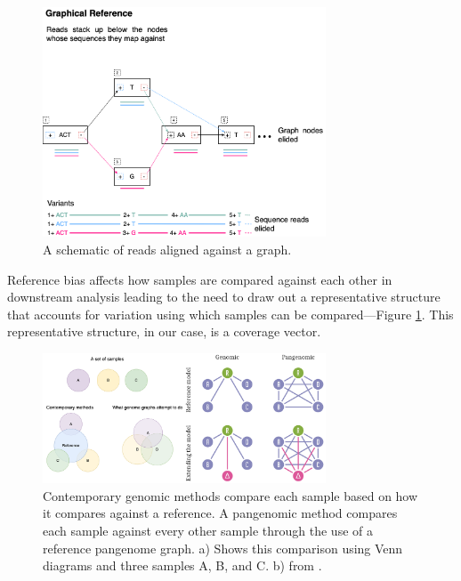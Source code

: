 \documentclass[10pt, a4paper]{article}
\begin{document}
\begin{figure}[htbp]
\centering
\includegraphics[width=0.75\textwidth]{../Figures/Alignment-graph-schematic.png}
\caption[Read alignment against a graph-based reference]{\label{fig:org1e6aadc}A schematic of reads aligned against a graph.}
\end{figure}


Reference bias affects how samples are compared against each other in downstream
analysis leading to the need to draw out a representative structure that
accounts for variation using which samples can be compared—Figure
\ref{fig:org1e6aadc}.
This representative structure, in our case, is a coverage vector.

\begin{figure}[htbp]
\centering
\includegraphics[width=0.75\textwidth]{../Figures/combined-all-vs-all.png}
\caption[Graphical all vs all comparison]{\label{fig:org607f8fe}Contemporary genomic methods compare each sample based on how it compares against a reference. A pangenomic method compares each sample against every other sample through the use of a reference pangenome graph. a) Shows this comparison using Venn diagrams and three samples A, B, and C. b) from \cite{eizengaSuccinctDynamicVariation2020}.}
\end{figure}
\end{document}
